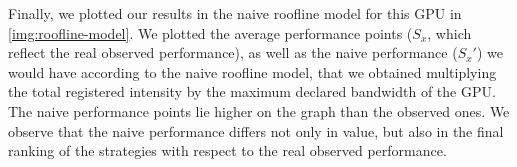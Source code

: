 Finally,
we plotted our results in the naive roofline model for this GPU in \ref{img:roofline-model}. We plotted the average performance points ($S_x$, which reflect the real observed performance), as well as the naive performance ($S_x'$) we would have according to the naive roofline model, that we obtained multiplying the total registered intensity by the maximum declared bandwidth of the GPU. The naive performance points lie higher on the graph than the observed ones. We observe that the naive performance differs not only in value, but also in the final ranking of the strategies with respect to the real observed performance.
